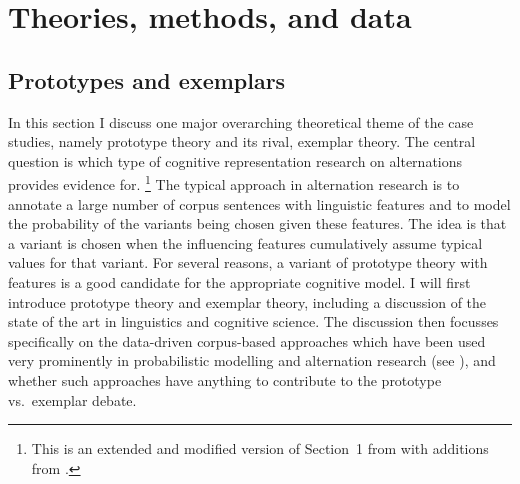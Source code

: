 \section{Theories, methods, and data}
\label{sec:theoriesmethodsanddata}

\subsection{Prototypes and exemplars}
\label{sec:prototypesandexemplars}

In this section I discuss one major overarching theoretical theme of the case studies, namely prototype theory and its rival, exemplar theory.
The central question is which type of cognitive representation research on alternations provides evidence for.%
\footnote{This is an extended and modified version of Section~1 from \citet{Schaefer2018} with additions from \citet{Schaefer2016c}.}
The typical approach in alternation research is to annotate a large number of corpus sentences with linguistic features and to model the probability of the variants being chosen given these features.
The idea is that a variant is chosen when the influencing features cumulatively assume typical values for that variant.
For several reasons, a variant of prototype theory with features \citep{Rosch1978} is a good candidate for the appropriate cognitive model.
I will first introduce prototype theory and exemplar theory, including a discussion of the state of the art in linguistics and cognitive science.
The discussion then focusses specifically on the data-driven corpus-based approaches which have been used very prominently in probabilistic modelling and alternation research (see \citealt{Gries2017a}), and whether such approaches have anything to contribute to the prototype vs.\ exemplar debate.

